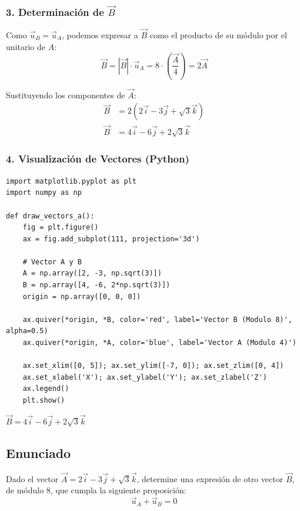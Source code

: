 \documentclass[12pt, a4paper]{article}
\begin{document}
\subsubsection*{3. Determinación de $\vec{B}$}
Como $\vec{u}_B = \vec{u}_A$, podemos expresar a $\vec{B}$ como el producto de su módulo por el unitario de $A$:
\begin{equation*}
    \vec{B} = |\vec{B}| \cdot \vec{u}_A = 8 \cdot \left( \frac{\vec{A}}{4} \right) = 2\vec{A}
\end{equation*}

Sustituyendo los componentes de $\vec{A}$:
\begin{align*}
    \vec{B} &= 2(2\vec{i} - 3\vec{j} + \sqrt{3}\vec{k}) \\
    \vec{B} &= 4\vec{i} - 6\vec{j} + 2\sqrt{3}\vec{k}
\end{align*}

\subsubsection*{4. Visualización de Vectores (Python)}
\begin{lstlisting}
import matplotlib.pyplot as plt
import numpy as np

def draw_vectors_a():
    fig = plt.figure()
    ax = fig.add_subplot(111, projection='3d')
    
    # Vector A y B
    A = np.array([2, -3, np.sqrt(3)])
    B = np.array([4, -6, 2*np.sqrt(3)])
    origin = np.array([0, 0, 0])
    
    ax.quiver(*origin, *B, color='red', label='Vector B (Modulo 8)', alpha=0.5)
    ax.quiver(*origin, *A, color='blue', label='Vector A (Modulo 4)')
    
    ax.set_xlim([0, 5]); ax.set_ylim([-7, 0]); ax.set_zlim([0, 4])
    ax.set_xlabel('X'); ax.set_ylabel('Y'); ax.set_zlabel('Z')
    ax.legend()
    plt.show()
\end{lstlisting}

\begin{tcolorbox}[colback=green!5!white, colframe=green!50!black, title=Respuesta Final]
\centering \Large $\vec{B} = 4\vec{i} - 6\vec{j} + 2\sqrt{3}\vec{k}$
\end{tcolorbox}

\newpage

\subsection*{Enunciado}
Dado el vector $\vec{A} = 2\vec{i} - 3\vec{j} + \sqrt{3} \vec{k}$, determine una expresión de otro vector $\vec{B}$, de módulo $8$, que cumpla la siguiente proposición:
\begin{equation*}
    \vec{u}_A + \vec{u}_B = 0
\end{equation*}
\end{document}
